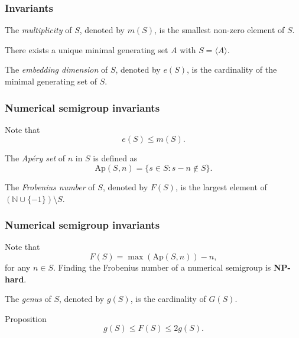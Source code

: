 \documentclass{beamer}
\def\NN{\ensuremath{\mathbb{N}}}
\begin{document}
\begin{frame}
\frametitle{Invariants}
\begin{definition}\label{def:smgps:multiplicity}
    The \textit{multiplicity} of $S$, denoted by $m(S)$, is the smallest non-zero element of $S$.
\end{definition}
\begin{theorem}\label{thm:smgps:minimal_generating_set}
    There exists a unique minimal generating set $A$ with $S = \langle A \rangle$.
\end{theorem}
\begin{definition}\label{def:smgps:embedding_dim}
    The \textit{embedding dimension} of $S$, denoted by $e(S)$, is the cardinality of the minimal generating set of $S$.
\end{definition}

\end{frame}   

\begin{frame}
\frametitle{Numerical semigroup invariants}
Note that
\[e(S) \leq m(S).\]
\begin{definition}\label{def:smgps:aperyset}
    The \textit{Ap\'ery set} of $n$ in $S$ is defined as
    \[\mathrm{Ap}(S, n) = \{s \in S : s - n \notin S\}.\]
\end{definition}

\begin{definition}\label{def:smgps:frobeniusnum}
    The \textit{Frobenius number} of $S$, denoted by $F(S)$, is the largest element of $(\NN \cup \{-1\}) \setminus S$.
\end{definition}
\end{frame}

\begin{frame}
    \frametitle{Numerical semigroup invariants}
    
    Note that
\begin{equation*}\label{eq:smgps:selmer1}
    F(S) = \max (\mathrm{Ap}(S, n)) - n,
\end{equation*}
for any $n \in S$. Finding the Frobenius number of a numerical semigroup is \textbf{NP-hard}.
    \begin{definition}\label{def:smgps:genus}
        The \textit{genus} of $S$, denoted by $g(S)$, is the cardinality of $G(S)$.
    \end{definition}
    \begin{block}{Proposition}
        \[g(S) \leq F(S) \leq 2g(S).\]
    \end{block}
\end{frame}
\end{document}
